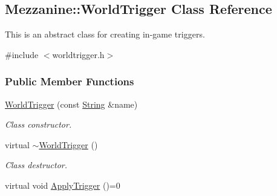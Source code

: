 \hypertarget{classMezzanine_1_1WorldTrigger}{
\subsection{Mezzanine::WorldTrigger Class Reference}
\label{classMezzanine_1_1WorldTrigger}
}


This is an abstract class for creating in-\/game triggers.  




{\ttfamily \#include $<$worldtrigger.h$>$}

\subsubsection*{Public Member Functions}
\begin{DoxyCompactItemize}
\item 
\hyperlink{classMezzanine_1_1WorldTrigger_afc43e40a268f0573db5b80bed976563d}{WorldTrigger} (const \hyperlink{namespaceMezzanine_acf9fcc130e6ebf08e3d8491aebcf1c86}{String} \&name)
\begin{DoxyCompactList}\small\item\em Class constructor. \item\end{DoxyCompactList}\item 
\hypertarget{classMezzanine_1_1WorldTrigger_abf4b164bc629f4c7a9e5cfb8dfcf919f}{
virtual \hyperlink{classMezzanine_1_1WorldTrigger_abf4b164bc629f4c7a9e5cfb8dfcf919f}{$\sim$WorldTrigger} ()}
\label{classMezzanine_1_1WorldTrigger_abf4b164bc629f4c7a9e5cfb8dfcf919f}

\begin{DoxyCompactList}\small\item\em Class destructor. \item\end{DoxyCompactList}\item 
\hypertarget{classMezzanine_1_1WorldTrigger_abbe8c0195fd7b9bc3c93f6c8b20d843b}{
virtual void \hyperlink{classMezzanine_1_1WorldTrigger_abbe8c0195fd7b9bc3c93f6c8b20d843b}{ApplyTrigger} ()=0}
\label{classMezzanine_1_1WorldTrigger_abbe8c0195fd7b9bc3c93f6c8b20d843b}


\end{DoxyCompactItemize}
